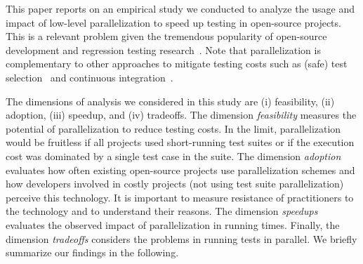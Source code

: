 

This paper reports on an empirical study we conducted to analyze the
usage and impact of low-level parallelization to speed up testing in
open-source projects.  This is a relevant problem given the tremendous
popularity of open-source development and regression testing
research~\cite{yoo-harman-stvr2012}.  Note that parallelization is
complementary to other approaches to mitigate testing costs such as
(safe) test
selection~\cite{Rothermel:1997:SER:248233.248262,gligoric-etal-issta2015}
and continuous integration~\cite{Saff:2003:RWD:951952.952340}.

The dimensions of analysis we considered in this study are (i)
feasibility, (ii) adoption, (iii) speedup, and (iv) tradeoffs.  The
dimension \emph{feasibility} measures the potential of parallelization
to reduce testing costs.  In the limit, parallelization would be
fruitless if all projects used short-running test suites or if the
execution cost was dominated by a single test case in the suite.  The
dimension \emph{adoption} evaluates how often existing open-source
projects use parallelization schemes and how developers involved in
costly projects (not using test suite parallelization) perceive this
technology.  It is important to measure resistance of practitioners to
the technology and to understand their reasons.  The dimension
\emph{speedups} evaluates the observed impact of
parallelization in running times.  Finally, the dimension
\emph{tradeoffs} considers the problems in running tests in parallel.
We briefly summarize our findings in the following.


